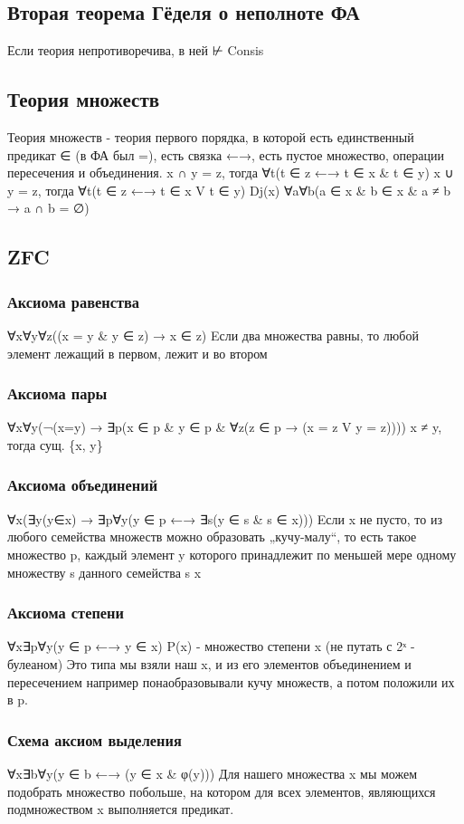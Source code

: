 \documentclass[11pt]{article}
\begin{document}
\subsection{Вторая теорема Гёделя о неполноте ФА}
\label{sec-2-38}
Если теория непротиворечива, в ней ⊬ Consis
\subsection{Теория множеств}
\label{sec-2-39}
Теория множеств - теория первого порядка, в которой
есть единственный предикат ∈ (в ФА был =), есть связка
←→, есть пустое множество, операции пересечения и
объединения.
x ∩ y = z, тогда ∀t(t ∈ z ←→ t ∈ x \& t ∈ y)
x ∪ y = z, тогда ∀t(t ∈ z ←→ t ∈ x V t ∈ y)
Dj(x) ∀a∀b(a ∈ x \& b ∈ x \& a ≠ b → a ∩ b = ∅)
\subsection{ZFC}
\label{sec-2-40}
\subsubsection{Аксиома равенства}
\label{sec-2-40-1}
∀x∀y∀z((x = y \& y ∈ z) → x ∈ z)
Eсли два множества равны, то любой элемент лежащий в первом,
лежит и во втором
\subsubsection{Аксиома пары}
\label{sec-2-40-2}
∀x∀y(¬(x=y) → ∃p(x ∈ p \& y ∈ p \& ∀z(z ∈ p → (x = z V y = z))))
x ≠ y, тогда сущ. \{x, y\}
\subsubsection{Аксиома объединений}
\label{sec-2-40-3}
∀x(∃y(y∈x) → ∃p∀y(y ∈ p ←→ ∃s(y ∈ s \& s ∈ x)))
Eсли x не пусто, то из любого семейства множеств можно
образовать „кучу-малу“, то есть такое множество p,
каждый элемент y которого принадлежит по меньшей мере
одному множеству s данного семейства s x
\subsubsection{Аксиома степени}
\label{sec-2-40-4}
∀x∃p∀y(y ∈ p ←→ y ∈ x)
P(x) - множество степени x (не путать с 2ˣ - булеаном)
Это типа мы взяли наш x, и из его элементов объединением и
пересечением например понаобразовывали кучу множеств, а потом
положили их в p.
\subsubsection{Схема аксиом выделения}
\label{sec-2-40-5}
∀x∃b∀y(y ∈ b ←→ (y ∈ x \& φ(y)))
Для нашего множества x мы можем подобрать множество побольше,
на котором для всех элементов, являющихся подмножеством x
выполняется предикат.
\end{document}
